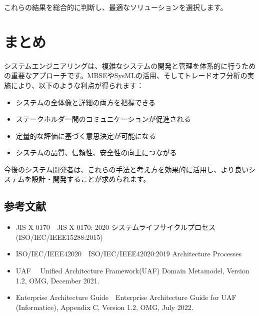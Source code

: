これらの結果を総合的に判断し、最適なソリューションを選択します。

\section{まとめ}

システムエンジニアリングは、複雑なシステムの開発と管理を体系的に行うための重要なアプローチです。MBSEやSysMLの活用、そしてトレードオフ分析の実施により、以下のような利点が得られます：

\begin{itemize}
    \item システムの全体像と詳細の両方を把握できる
    \item ステークホルダー間のコミュニケーションが促進される
    \item 定量的な評価に基づく意思決定が可能になる
    \item システムの品質、信頼性、安全性の向上につながる
\end{itemize}

今後のシステム開発者は、これらの手法と考え方を効果的に活用し、より良いシステムを設計・開発することが求められます。
\subsection{参考文献}
\begin{itemize}
\item
  \lbrack JIS X 0170\rbrack\ \ JIS X 0170: 2020 システムライフサイクルプロセス (ISO/IEC/IEEE15288:2015)
\item
  \lbrack ISO/IEC/IEEE42020\rbrack\ \ ISO/IEC/IEEE42020:2019 Architecture Processes
\item
  \lbrack UAF \rbrack\ \ Unified Architecture Framework(UAF) Domain Metamodel, Version 1.2, OMG, December 2021.
\item
  \lbrack Enterprise Architecture Guide\rbrack\ \ Enterprise Architecture Guide for UAF (Informatice), Appendix C, Version 1.2, OMG, July 2022.
\end{itemize}
